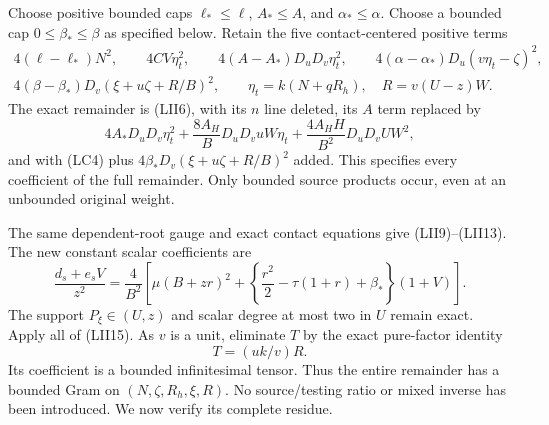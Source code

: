 Choose positive bounded caps $\ell_*\le\ell$,
$A_*\le A$, and $\alpha_*\le\alpha$.  Choose a bounded cap
$0\le\beta_*\le\beta$ as specified below.  Retain the five
contact-centered positive terms
\[
\begin{gathered}
 4(\ell-\ell_*)N^2,\qquad 4CV\eta_t^2,\qquad
 4(A-A_*)D_uD_v\eta_t^2,\qquad
 4(\alpha-\alpha_*)D_u(v\eta_t-\zeta)^2,\\
 4(\beta-\beta_*)D_v(\xi+u\zeta+R/B)^2,
 \qquad \eta_t=k(N+qR_h),\quad R=v(U-z)W.
\end{gathered}
\tag{LU4}
\]
The exact remainder is (LII6), with its $n$ line deleted, its $A$
term replaced by
\[
 4A_*D_uD_v\eta_t^2
 +\frac{8A_H}B D_uD_vuW\eta_t
 +\frac{4A_HH}{B^2}D_uD_vUW^2,
                                                               \tag{LU5}
\]
and with (LC4) plus $4\beta_*D_v(\xi+u\zeta+R/B)^2$ added.
This specifies every coefficient of the full remainder.  Only
bounded source products occur, even at an unbounded original weight.

The same dependent-root gauge and exact contact equations give
(LII9)--(LII13).  The new constant scalar coefficients are
\[
 \frac{d_s+e_sV}{z^2}=
 \frac4{B^2}\left[
 \mu(B+zr)^2+
 \left\{\frac{r^2}{2}-\tau(1+r)+\beta_*\right\}(1+V)
 \right].                                                   \tag{LU6}
\]
The support $P_\xi\in(U,z)$ and scalar degree at most two in $U$
remain exact.  Apply all of (LII15).  As $v$ is a unit, eliminate
$T$ by the exact pure-factor identity
\[
                        T=(uk/v)R.                         \tag{LU7}
\]
Its coefficient is a bounded infinitesimal tensor.  Thus the entire
remainder has a bounded Gram on
$(N,\zeta,R_h,\xi,R)$.  No source/testing ratio or mixed inverse
has been introduced.  We now verify its complete residue.

